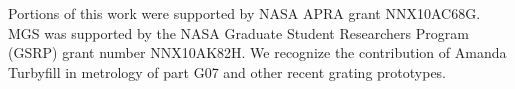 \documentclass[]{spie}  %
\begin{document}
\acknowledgments
 
Portions of this work were supported by NASA APRA grant NNX10AC68G.  MGS was supported by the NASA Graduate Student Researchers Program (GSRP) grant number NNX10AK82H.  We recognize the contribution of Amanda Turbyfill in metrology of part G07 and other recent grating prototypes.

\end{document}

